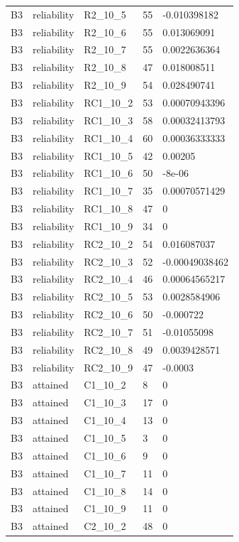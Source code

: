\begin{longtable}{lllll}
B3 & reliability & R2\_10\_5 & 55 & -0.010398182 \\
B3 & reliability & R2\_10\_6 & 55 & 0.013069091 \\
B3 & reliability & R2\_10\_7 & 55 & 0.0022636364 \\
B3 & reliability & R2\_10\_8 & 47 & 0.018008511 \\
B3 & reliability & R2\_10\_9 & 54 & 0.028490741 \\
B3 & reliability & RC1\_10\_2 & 53 & 0.00070943396 \\
B3 & reliability & RC1\_10\_3 & 58 & 0.00032413793 \\
B3 & reliability & RC1\_10\_4 & 60 & 0.00036333333 \\
B3 & reliability & RC1\_10\_5 & 42 & 0.00205 \\
B3 & reliability & RC1\_10\_6 & 50 & -8e-06 \\
B3 & reliability & RC1\_10\_7 & 35 & 0.00070571429 \\
B3 & reliability & RC1\_10\_8 & 47 & 0 \\
B3 & reliability & RC1\_10\_9 & 34 & 0 \\
B3 & reliability & RC2\_10\_2 & 54 & 0.016087037 \\
B3 & reliability & RC2\_10\_3 & 52 & -0.00049038462 \\
B3 & reliability & RC2\_10\_4 & 46 & 0.00064565217 \\
B3 & reliability & RC2\_10\_5 & 53 & 0.0028584906 \\
B3 & reliability & RC2\_10\_6 & 50 & -0.000722 \\
B3 & reliability & RC2\_10\_7 & 51 & -0.01055098 \\
B3 & reliability & RC2\_10\_8 & 49 & 0.0039428571 \\
B3 & reliability & RC2\_10\_9 & 47 & -0.0003 \\
B3 & attained & C1\_10\_2 & 8 & 0 \\
B3 & attained & C1\_10\_3 & 17 & 0 \\
B3 & attained & C1\_10\_4 & 13 & 0 \\
B3 & attained & C1\_10\_5 & 3 & 0 \\
B3 & attained & C1\_10\_6 & 9 & 0 \\
B3 & attained & C1\_10\_7 & 11 & 0 \\
B3 & attained & C1\_10\_8 & 14 & 0 \\
B3 & attained & C1\_10\_9 & 11 & 0 \\
B3 & attained & C2\_10\_2 & 48 & 0 \\

\end{longtable}
